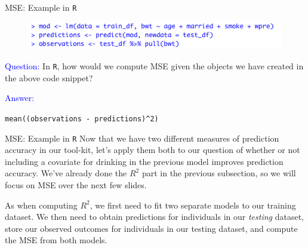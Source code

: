 \documentclass[10pt,t]{beamer}
\begin{document}
\begin{frame}{MSE: Example in \texttt{R}}

\begin{figure}
	\centering \includegraphics[scale=0.5]{mse1.png}
\end{figure}
\vspace{0.3cm} 

\textcolor{blue}{Question:} In \texttt{R}, how would we compute MSE given the objects we have created in the above code snippet?

\vspace{0.3cm}

\textcolor{blue}{Answer:} 

\vspace{0.3cm}

\texttt{mean((observations - predictions)\^{}2)} 
\end{frame}

\begin{frame}{MSE: Example in \texttt{R}}
Now that we have two different measures of prediction accuracy in our tool-kit, let's apply them both to our question of whether or not including a covariate for drinking in the previous model improves prediction accuracy. We've already done the $R^2$ part in the previous subsection, so we will focus on MSE over the next few slides.

\vspace{0.3cm}
As when computing $R^2$, we first need to fit two separate models to our training dataset.
We then need to obtain predictions for individuals in our \textit{testing} dataset, store our observed outcomes for individuals in our testing dataset, and compute the MSE from both models.
\end{frame}
\end{document}
